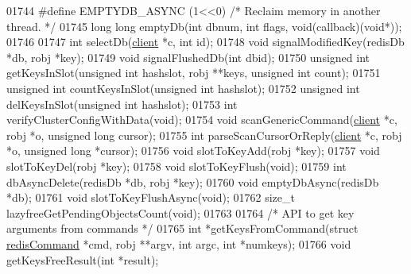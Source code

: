 \begin{DoxyCode}
{{{{{{{01744 \textcolor{preprocessor}{#}\textcolor{preprocessor}{define} \textcolor{preprocessor}{EMPTYDB\_ASYNC} \textcolor{preprocessor}{(}1\textcolor{preprocessor}{<<}0\textcolor{preprocessor}{)}    \textcolor{comment}{/* Reclaim memory in another thread. */}
01745 \textcolor{keywordtype}{long} \textcolor{keywordtype}{long} emptyDb(\textcolor{keywordtype}{int} dbnum, \textcolor{keywordtype}{int} flags, \textcolor{keywordtype}{void}(callback)(\textcolor{keywordtype}{void}*));
01746 
01747 \textcolor{keywordtype}{int} selectDb(\hyperlink{structclient}{client} *c, \textcolor{keywordtype}{int} id);
01748 \textcolor{keywordtype}{void} signalModifiedKey(redisDb *db, robj *key);
01749 \textcolor{keywordtype}{void} signalFlushedDb(\textcolor{keywordtype}{int} dbid);
01750 \textcolor{keywordtype}{unsigned} \textcolor{keywordtype}{int} getKeysInSlot(\textcolor{keywordtype}{unsigned} \textcolor{keywordtype}{int} hashslot, robj **keys, \textcolor{keywordtype}{unsigned} \textcolor{keywordtype}{int} count);
01751 \textcolor{keywordtype}{unsigned} \textcolor{keywordtype}{int} countKeysInSlot(\textcolor{keywordtype}{unsigned} \textcolor{keywordtype}{int} hashslot);
01752 \textcolor{keywordtype}{unsigned} \textcolor{keywordtype}{int} delKeysInSlot(\textcolor{keywordtype}{unsigned} \textcolor{keywordtype}{int} hashslot);
01753 \textcolor{keywordtype}{int} verifyClusterConfigWithData(\textcolor{keywordtype}{void});
01754 \textcolor{keywordtype}{void} scanGenericCommand(\hyperlink{structclient}{client} *c, robj *o, \textcolor{keywordtype}{unsigned} \textcolor{keywordtype}{long} cursor);
01755 \textcolor{keywordtype}{int} parseScanCursorOrReply(\hyperlink{structclient}{client} *c, robj *o, \textcolor{keywordtype}{unsigned} \textcolor{keywordtype}{long} *cursor);
01756 \textcolor{keywordtype}{void} slotToKeyAdd(robj *key);
01757 \textcolor{keywordtype}{void} slotToKeyDel(robj *key);
01758 \textcolor{keywordtype}{void} slotToKeyFlush(\textcolor{keywordtype}{void});
01759 \textcolor{keywordtype}{int} dbAsyncDelete(redisDb *db, robj *key);
01760 \textcolor{keywordtype}{void} emptyDbAsync(redisDb *db);
01761 \textcolor{keywordtype}{void} slotToKeyFlushAsync(\textcolor{keywordtype}{void});
01762 size\_t lazyfreeGetPendingObjectsCount(\textcolor{keywordtype}{void});
01763 
01764 \textcolor{comment}{/* API to get key arguments from commands */}
01765 \textcolor{keywordtype}{int} *getKeysFromCommand(\textcolor{keyword}{struct} \hyperlink{structredisCommand}{redisCommand} *cmd, robj **argv, \textcolor{keywordtype}{int} argc, \textcolor{keywordtype}{int} *numkeys);
01766 \textcolor{keywordtype}{void} getKeysFreeResult(\textcolor{keywordtype}{int} *result);
}}}}}}}
\end{DoxyCode}
